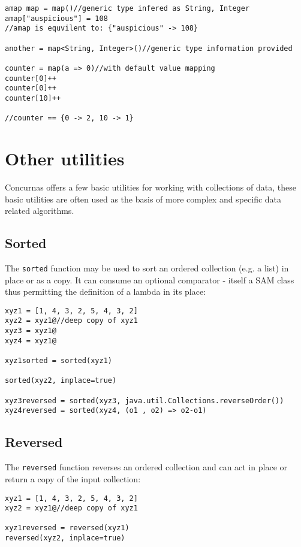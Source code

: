 \documentclass[conc-doc]{subfiles}
\begin{document}
\begin{lstlisting}
amap map = map()//generic type infered as String, Integer
amap["auspicious"] = 108
//amap is equvilent to: {"auspicious" -> 108}

another = map<String, Integer>()//generic type information provided

counter = map(a => 0)//with default value mapping
counter[0]++
counter[0]++
counter[10]++

//counter == {0 -> 2, 10 -> 1}
\end{lstlisting}

\section{Other utilities}
Concurnas offers a few basic utilities for working with collections of data, these basic utilities are often used as the basis of more complex and specific data related algorithms.

\subsection{Sorted}
The \lstinline{sorted} function may be used to sort an ordered collection (e.g. a list) in place or as a copy. It can consume an optional comparator - itself a SAM class thus permitting the definition of a lambda in its place:

\begin{lstlisting}
xyz1 = [1, 4, 3, 2, 5, 4, 3, 2]
xyz2 = xyz1@//deep copy of xyz1
xyz3 = xyz1@
xyz4 = xyz1@

xyz1sorted = sorted(xyz1)

sorted(xyz2, inplace=true)

xyz3reversed = sorted(xyz3, java.util.Collections.reverseOrder())
xyz4reversed = sorted(xyz4, (o1 , o2) => o2-o1)
\end{lstlisting}

\subsection{Reversed}
The \lstinline{reversed} function reverses an ordered collection and can act in place or return a copy of the input collection:

\begin{lstlisting}
xyz1 = [1, 4, 3, 2, 5, 4, 3, 2]
xyz2 = xyz1@//deep copy of xyz1

xyz1reversed = reversed(xyz1)
reversed(xyz2, inplace=true)
\end{lstlisting}
\end{document}

